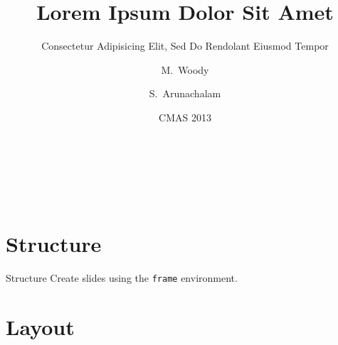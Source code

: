 \documentclass{beamer}	%
\title[Lorem Ipsum] %
{Lorem Ipsum Dolor Sit Amet}	%
\subtitle
{Consectetur Adipisicing Elit, Sed Do Rendolant Eiusmod Tempor} %
\author[Woody, Arunachalam] %
{M.~Woody\inst{1,2} \and S.~Arunachalam\inst{1}}
\institute[UNC-CH] 				%
{
  \inst{1}%
  Center for Environmental Modeling for Policy Development\\
  Institute for the Environment\\
  University of North Carolina at Chapel Hill
  \and
  \inst{2}%
  Department of Environmental Sciences and Engineering\\
  University of North Carolina at Chapel Hill
}
\date[\today]				%
{CMAS 2013}						%
\begin{document}
\begin{frame}{~}						%
\titlepage
\end{frame}

\begin{frame}{~}
  \tableofcontents						%
\end{frame}

\section{Structure}
\begin{frame}{Structure}
	Create slides using the \texttt{frame} environment.
\end{frame}


\section{Layout}
\end{document}
